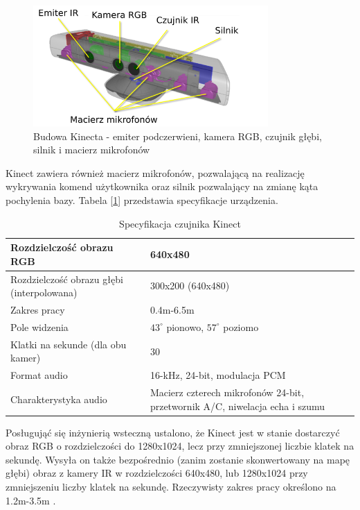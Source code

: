 \begin{figure}[H]
	\centering
	\includegraphics[width=0.8\textwidth]{gfx/kinect2pl.png}
	\caption{Budowa Kinecta - emiter podczerwieni, kamera RGB, czujnik głębi, silnik i macierz mikrofonów \cite{kinect}}
	\label{fig:kinect}
\end{figure}

Kinect zawiera również macierz mikrofonów, pozwalającą na realizację wykrywania komend użytkownika oraz silnik pozwalający na zmianę kąta pochylenia bazy. Tabela [\ref{tab:kinect_specification}] przedstawia specyfikacje urządzenia.

\begin{table}[H]
\centering
{\renewcommand{\arraystretch}{1.5}
\begin{tabular}{ p{5cm} | p{7cm} }
 Rozdzielczość obrazu RGB & 640x480 \\
 \hline
 Rozdzielczość obrazu głębi (interpolowana) & 300x200 (640x480) \\
 \hline
 Zakres pracy & 0.4m-6.5m \\
 \hline
 Pole widzenia & $43^{\circ}$ pionowo, $57^{\circ}$ poziomo \\
 \hline
 Klatki na sekunde (dla obu kamer) & 30 \\
 \hline
 Format audio & 16-kHz, 24-bit, modulacja PCM \\
 \hline
 Charakterystyka audio & Macierz czterech mikrofonów 24-bit, przetwornik A/C, niwelacja echa i szumu
\end{tabular}}
\caption{Specyfikacja czujnika Kinect \cite{kinect}}
\label{tab:kinect_specification}
\end{table}

Posługująć się inżynierią wsteczną ustalono, że Kinect jest w stanie dostarczyć obraz RGB o rozdzielczości do 1280x1024, lecz przy zmniejszonej liczbie klatek na sekundę. Wysyła on także bezpośrednio (zanim zostanie skonwertowany na mapę głębi) obraz z kamery IR w rozdzielczości 640x480, lub 1280x1024 przy zmniejszeniu liczby klatek na sekundę. Rzeczywisty zakres pracy określono na 1.2m-3.5m \cite{kinect_openkinect}. \\

